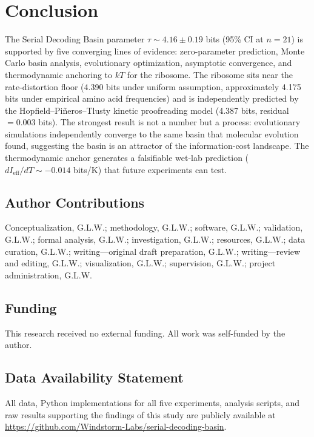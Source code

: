 \documentclass[12pt,a4paper]{article}
\begin{document}
\section{Conclusion}

The Serial Decoding Basin parameter $\tau \sim 4.16 \pm 0.19$ bits (95\% CI at $n = 21$) is supported by five converging lines of evidence: zero-parameter prediction, Monte Carlo basin analysis, evolutionary optimization, asymptotic convergence, and thermodynamic anchoring to $kT$ for the ribosome. The ribosome sits near the rate-distortion floor (4.390 bits under uniform assumption, approximately 4.175 bits under empirical amino acid frequencies) and is independently predicted by the Hopfield--Pi\~neros--Tlusty kinetic proofreading model (4.387 bits, residual $= 0.003$ bits). The strongest result is not a number but a process: evolutionary simulations independently converge to the same basin that molecular evolution found, suggesting the basin is an attractor of the information-cost landscape. The thermodynamic anchor generates a falsifiable wet-lab prediction ($dI_{\mathrm{eff}}/dT \sim -0.014$ bits/K) that future experiments can test.

\subsection*{Author Contributions}

Conceptualization, G.L.W.; methodology, G.L.W.; software, G.L.W.; validation, G.L.W.; formal analysis, G.L.W.; investigation, G.L.W.; resources, G.L.W.; data curation, G.L.W.; writing---original draft preparation, G.L.W.; writing---review and editing, G.L.W.; visualization, G.L.W.; supervision, G.L.W.; project administration, G.L.W.

\subsection*{Funding}

This research received no external funding. All work was self-funded by the author.

\subsection*{Data Availability Statement}

All data, Python implementations for all five experiments, analysis scripts, and raw results supporting the findings of this study are publicly available at \url{https://github.com/Windstorm-Labs/serial-decoding-basin}.
\end{document}
